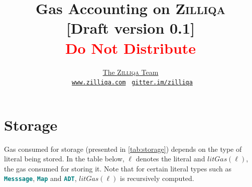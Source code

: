 \documentclass[10pt]{article}
\begin{document}
\title{\Huge{\textbf{Gas Accounting on \textsc{Zilliqa}}} \\ \small{[Draft version
0.1]} \\ \small{\textcolor{red}{Do Not Distribute}}}

\author{
 	\href{https://www.zilliqa.com/team.html}{The \textsc{Zilliqa} Team} \\
    \Mundus~\href{https://www.zilliqa.com}{\texttt{www.zilliqa.com}}
    \phantom{xx}\faQuestionCircle~\href{https://gitter.im/Zilliqa/SmartContract}{\texttt{gitter.im/zilliqa}}
}


\maketitle

\section{Storage}

Gas consumed for storage (presented in \autoref{tab:storage}) depends on the
type of literal being stored. In the table below, $\ell$ denotes the literal
and $litGas(\ell)$, the gas consumed for storing it. Note that for certain
literal types such as \textbf{\texttt{\textcolor{teal}{Messsage}}},
\textbf{\texttt{\textcolor{teal}{Map}}} and
\textbf{\texttt{\textcolor{teal}{ADT}}}, $litGas(\ell)$ is recursively
computed. 
\end{document}
